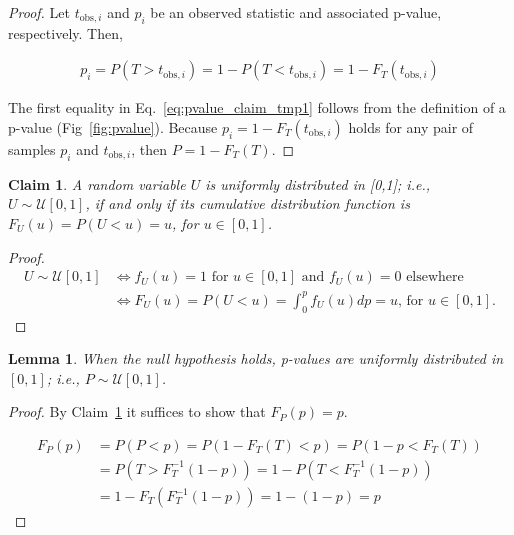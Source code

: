 \documentclass[12pt]{article}
\newtheorem{claim}{Claim}
\newtheorem{lemma}{Lemma}
\begin{document}
\begin{appendices}
\begin{proof}
    Let $t_{\text{obs},i}$ and $p_i$ be an observed statistic and associated
    p-value, respectively. Then,

    \begin{align}
        p_i=P(T>t_{\text{obs},i})=1-P(T<t_{\text{obs},i})=1-F_T(t_{\text{obs},i})\label{eq:pvalue_claim_tmp1}
    \end{align}

    The first equality in Eq.~\ref{eq:pvalue_claim_tmp1} follows from the
    definition of a p-value (Fig~\ref{fig:pvalue}). Because
    $p_i=1-F_T(t_{\text{obs},i})$ holds for any pair of samples $p_i$
    and $t_{\text{obs},i}$, then $P=1-F_T(T)$.
\end{proof}

\begin{claim}

    A random variable $U$ is uniformly distributed in [0,1]; i.e.,
    $U\sim\mathcal{U}[0,1]$, if and only if its cumulative distribution
    function is $F_U(u)=P(U<u)=u$, for $u\in[0,1]$.
    \label{claim:uniform_cummulative}

\end{claim}

\begin{proof}

    \begin{align}
        U\sim\mathcal{U}[0,1] &\iff f_U(u)=1 \text{ for } u\in[0,1] \text{ and } f_U(u)=0 \text{ elsewhere } \\
                              &\iff F_U(u)=P(U<u)=\int_0^pf_U(u)dp=u\text{, for }u\in[0,1].
    \end{align}

\end{proof}

\begin{lemma}

    When the null hypothesis holds, p-values are uniformly distributed in
    $[0,1]$; i.e., $P\sim\mathcal{U}[0,1]$.
    \label{lemma:p_values_uniform01}
\end{lemma}

\begin{proof}
    By Claim~\ref{claim:uniform_cummulative} it suffices to show that $F_P(p)=p$.

    \begin{align}
        F_P(p)&=P(P<p)=P(1-F_T(T)<p)=P(1-p<F_T(T))\label{eq:lemmaUniformPvaluesLine1}\\
              &=P(T>F_T^{-1}(1-p))=1-P(T<F_T^{-1}(1-p))\nonumber\\
              &=1-F_T(F_T^{-1}(1-p))=1-(1-p)=p\nonumber
    \end{align}


\end{proof}
\end{appendices}
\end{document}
